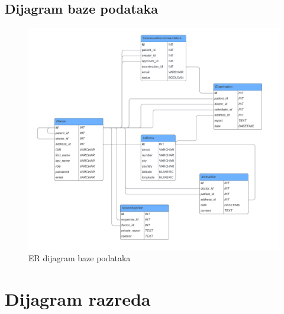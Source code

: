 		\subsection{Dijagram baze podataka}
		    \begin{figure}[H]
			     \includegraphics[width=\textwidth]{slike/ERdijagram.png} 
			     \caption{ER dijagram baze podataka} 
		    \end{figure}
		\eject
		
			
		\section{Dijagram razreda}
		
			
			
			
